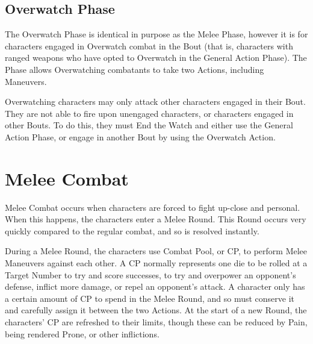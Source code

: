 \documentclass[oneside,11pt,english]{book}
\begin{document}
\subsection{Overwatch Phase}
The Overwatch Phase is identical in purpose as the Melee Phase, however it is
for characters engaged in Overwatch combat in the Bout (that is, characters with
ranged weapons who have opted to Overwatch in the General Action Phase). The
Phase allows Overwatching combatants to take two Actions, including Maneuvers.

Overwatching characters may only attack other characters engaged in their Bout.
They are not able to fire upon unengaged characters, or characters engaged in
other Bouts. To do this, they must End the Watch and either use the General
Action Phase, or engage in another Bout by using the Overwatch Action.

\section{Melee Combat}\label{sec:melee-combat}
Melee Combat occurs when characters are forced to fight up-close and personal.
When this happens, the characters enter a Melee Round. This Round occurs very
quickly compared to the regular combat, and so is resolved instantly.

During a Melee Round, the characters use Combat Pool, or CP, to perform Melee
Maneuvers against each other. A CP normally represents one die to be rolled at a
Target Number to try and score successes, to try and overpower an opponent’s
defense, inflict more damage, or repel an opponent’s attack. A character only
has a certain amount of CP to spend in the Melee Round, and so must conserve it
and carefully assign it between the two Actions. At the start of a new Round,
the characters’ CP are refreshed to their limits, though these can be reduced by
Pain, being rendered Prone, or other inflictions.
\end{document}
